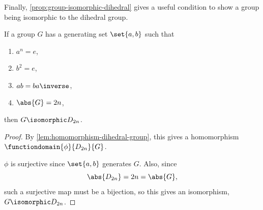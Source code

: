 Finally, \autoref{prop:group-isomorphic-dihedral} gives a useful condition to show a group being isomorphic to the dihedral group.

\begin{proposition}
    \label{prop:group-isomorphic-dihedral}%
    If a group \(G\) has a generating set \(\set{a, b}\) such that
    \begin{enumerate}
        \item \(a^n = e\),
        \item \(b^2 = e\),
        \item \(ab = b a \inverse\),
        \item \(\abs{G} = 2n\),
    \end{enumerate}
    then \(G \isomorphic D_{2n}\).
\end{proposition}

\begin{proof}
    By \autoref{lem:homomorphism-dihedral-group}, this gives a homomorphism \(\functiondomain{\phi}{D_{2n}}{G}\).

    \(\phi\) is surjective since \(\set{a, b}\) generates \(G\). Also, since
    \[
        \abs{D_{2n}} = 2n = \abs{G},
    \]
    such a surjective map must be a bijection, so this gives an isomorphism, \(G \isomorphic D_{2n}\).
\end{proof}